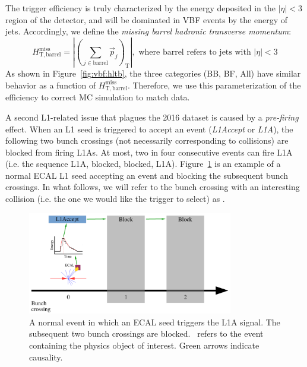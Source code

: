 The trigger efficiency is truly characterized by the energy deposited in the $|\eta|<3$ region of the detector, and will be dominated in VBF events by the energy of jets.
Accordingly, we define the \emph{missing barrel hadronic transverse momentum}:
\begin{equation}
    H_\mathrm{T,barrel}^\mathrm{miss} = \left|\left(\sum_{j\in\text{barrel}} \vec{p}_j \right)_\mathrm{T}\right|, \text{ where barrel refers to jets with $|\eta|<3$}
\end{equation}
As shown in Figure~\ref{fig:vbf:hltb}, the three categories (BB, BF, All) have similar behavior as a function of $H_\mathrm{T,barrel}^\mathrm{miss}$.
Therefore, we use this parameterization of the efficiency to correct MC simulation to match data. 

A second L1-related issue that plagues the 2016 dataset is caused by a \emph{pre-firing} effect.
When an L1 seed is triggered to accept an event (\emph{L1Accept} or \emph{L1A}), the following two bunch crossings (not necessarily corresponding to collisions) are blocked from firing L1As. 
At most, two in four consecutive events can fire L1A (i.e. the sequence L1A, blocked, blocked, L1A).
Figure~\ref{fig:vbf:pre1} is an example of a normal ECAL L1 seed accepting an event and blocking the subsequent bunch crossings.
In what follows, we will refer to the bunch crossing with an interesting collision (i.e. the one we would like the trigger to select) as .

\begin{figure}
    \begin{center}
        \includegraphics[width=0.8\textwidth,page=1]{figures/vbf/triggers/l1diag.pdf}
        \caption{A normal event in which an ECAL seed triggers the L1A signal. 
                 The subsequent two bunch crossings are blocked. 
                 ~refers to the event containing the physics object of interest.
                 Green arrows indicate causality.}
        \label{fig:vbf:pre1}
    \end{center}
\end{figure}

